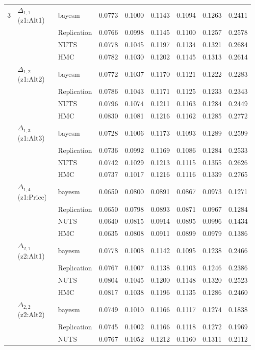 \begin{longtable}{cllcccccc}
3 & $\Delta_{1,1}$ (z1:Alt1) & bayesm & 0.0773 & 0.1000 & 0.1143 & 0.1094 & 0.1263 & 0.2411 \\
 &  & Replication & 0.0766 & 0.0998 & 0.1145 & 0.1100 & 0.1257 & 0.2578 \\
 &  & NUTS & 0.0778 & 0.1045 & 0.1197 & 0.1134 & 0.1321 & 0.2684 \\
 &  & HMC & 0.0782 & 0.1030 & 0.1202 & 0.1145 & 0.1313 & 0.2614 \\
 & $\Delta_{1,2}$ (z1:Alt2) & bayesm & 0.0772 & 0.1037 & 0.1170 & 0.1121 & 0.1222 & 0.2283 \\
 &  & Replication & 0.0786 & 0.1043 & 0.1171 & 0.1125 & 0.1233 & 0.2343 \\
 &  & NUTS & 0.0796 & 0.1074 & 0.1211 & 0.1163 & 0.1284 & 0.2449 \\
 &  & HMC & 0.0830 & 0.1081 & 0.1216 & 0.1162 & 0.1285 & 0.2772 \\
 & $\Delta_{1,3}$ (z1:Alt3) & bayesm & 0.0728 & 0.1006 & 0.1173 & 0.1093 & 0.1289 & 0.2599 \\
 &  & Replication & 0.0736 & 0.0992 & 0.1169 & 0.1086 & 0.1284 & 0.2533 \\
 &  & NUTS & 0.0742 & 0.1029 & 0.1213 & 0.1115 & 0.1355 & 0.2626 \\
 &  & HMC & 0.0737 & 0.1017 & 0.1216 & 0.1116 & 0.1339 & 0.2765 \\
 & $\Delta_{1,4}$ (z1:Price) & bayesm & 0.0650 & 0.0800 & 0.0891 & 0.0867 & 0.0973 & 0.1271 \\
 &  & Replication & 0.0650 & 0.0798 & 0.0893 & 0.0871 & 0.0967 & 0.1284 \\
 &  & NUTS & 0.0640 & 0.0815 & 0.0914 & 0.0895 & 0.0996 & 0.1434 \\
 &  & HMC & 0.0635 & 0.0808 & 0.0911 & 0.0899 & 0.0979 & 0.1386 \\
 & $\Delta_{2,1}$ (z2:Alt1) & bayesm & 0.0778 & 0.1008 & 0.1142 & 0.1095 & 0.1238 & 0.2466 \\
 &  & Replication & 0.0767 & 0.1007 & 0.1138 & 0.1103 & 0.1246 & 0.2386 \\
 &  & NUTS & 0.0804 & 0.1045 & 0.1200 & 0.1148 & 0.1320 & 0.2523 \\
 &  & HMC & 0.0817 & 0.1038 & 0.1196 & 0.1135 & 0.1286 & 0.2460 \\
 & $\Delta_{2,2}$ (z2:Alt2) & bayesm & 0.0749 & 0.1010 & 0.1166 & 0.1117 & 0.1274 & 0.1838 \\
 &  & Replication & 0.0745 & 0.1002 & 0.1166 & 0.1118 & 0.1272 & 0.1969 \\
 &  & NUTS & 0.0767 & 0.1052 & 0.1212 & 0.1160 & 0.1311 & 0.2112 \\

\end{longtable}

